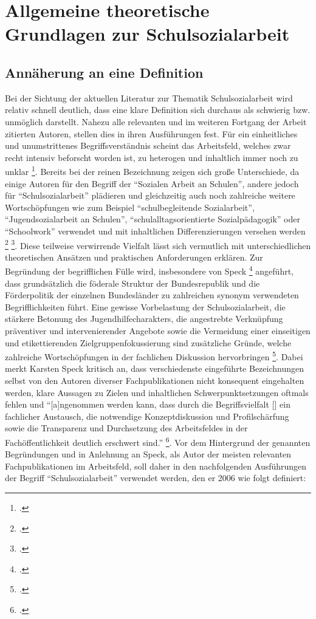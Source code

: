 \section{Allgemeine theoretische Grundlagen zur Schulsozialarbeit}
\label{sec:AllgemeineTheoretischeGrundlagenZurSchulsozialarbeit}

\subsection{Annäherung an eine Definition}
\label{sec:AnnäherungAnEineDefinition}

Bei der Sichtung der aktuellen Literatur zur Thematik Schulsozialarbeit wird relativ schnell deutlich, dass eine klare Definition sich durchaus als schwierig bzw. unmöglich darstellt. Nahezu alle relevanten und im weiteren Fortgang der Arbeit zitierten Autoren, stellen dies in ihren Ausführungen fest. Für ein einheitliches und unumstrittenes Begriffsverständnis scheint das Arbeitsfeld, welches zwar recht intensiv beforscht worden ist, zu heterogen und inhaltlich immer noch zu unklar \footcite[vgl.][7]{Speck2010}. Bereits bei der reinen Bezeichnung zeigen sich große Unterschiede, da einige Autoren für den Begriff der "`Sozialen Arbeit an Schulen"', andere jedoch für "`Schulsozialarbeit"' plädieren und gleichzeitig auch noch zahlreiche weitere Wortschöpfungen wie zum Beispiel "`schulbegleitende Sozialarbeit"', "`Jugendsozialarbeit an Schulen"', "`schulalltagsorientierte Sozialpädagogik"' oder "`Schoolwork"' verwendet und mit inhaltlichen Differenzierungen versehen werden \footcite [vgl.][14]{Spies2011} \footcite[vgl.][17f]{Stuewe2015}. Diese teilweise verwirrende Vielfalt lässt sich vermutlich mit unterschiedlichen theoretischen Ansätzen und praktischen Anforderungen erklären. Zur Begründung der begrifflichen Fülle wird, insbesondere von Speck \footcite[vgl.][23]{Speck2007} angeführt, dass grundsätzlich die föderale Struktur der Bundesrepublik und die Förderpolitik der einzelnen Bundesländer zu zahlreichen synonym verwendeten Begrifflichkeiten führt. Eine gewisse Vorbelastung der Schulsozialarbeit, die stärkere Betonung des Jugendhilfecharakters, die angestrebte Verknüpfung präventiver und intervenierender Angebote sowie die Vermeidung einer einseitigen und etikettierenden Zielgruppenfokussierung sind zusätzliche Gründe, welche zahlreiche Wortschöpfungen in der fachlichen Diskussion hervorbringen \footcite[vgl.][23]{Speck2007}. Dabei merkt Karsten Speck kritisch an, dass verschiedenste eingeführte Bezeichnungen selbst von den Autoren diverser Fachpublikationen nicht konsequent eingehalten werden, klare Aussagen zu Zielen und inhaltlichen Schwerpunktsetzungen oftmals fehlen und "`[a]ngenommen werden kann, dass durch die Begriffsvielfalt [\punkte] ein fachlicher Austausch, die notwendige Konzeptdiskussion und Profilschärfung sowie die Transparenz und Durchsetzung des Arbeitsfeldes in der Fachöffentlichkeit deutlich erschwert sind."' \footcite[24]{Speck2007}. Vor dem Hintergrund der genannten Begründungen und in Anlehnung an Speck, als Autor der meisten relevanten Fachpublikationen im Arbeitsfeld, soll daher in den nachfolgenden Ausführungen der Begriff "`Schulsozialarbeit"' verwendet werden, den er 2006 wie folgt definiert: %
